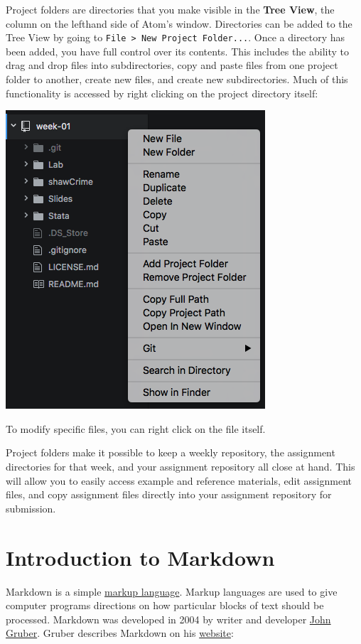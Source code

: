 \documentclass[]{book}
\theoremstyle{definition}
\theoremstyle{definition}
\theoremstyle{definition}
\theoremstyle{remark}
\begin{document}
Project folders are directories that you make visible in the
\textbf{Tree View}, the column on the lefthand side of Atom's window.
Directories can be added to the Tree View by going to
\texttt{File\ \textgreater{}\ New\ Project\ Folder...}. Once a directory
has been added, you have full control over its contents. This includes
the ability to drag and drop files into subdirectories, copy and paste
files from one project folder to another, create new files, and create
new subdirectories. Much of this functionality is accessed by right
clicking on the project directory itself:

\includegraphics[width=0.75\linewidth]{images/atomProject}

To modify specific files, you can right click on the file itself.

Project folders make it possible to keep a weekly repository, the
assignment directories for that week, and your assignment repository all
close at hand. This will allow you to easily access example and
reference materials, edit assignment files, and copy assignment files
directly into your assignment repository for submission.

\chapter{Introduction to Markdown}\label{introduction-to-markdown}

Markdown is a simple
\href{https://en.wikipedia.org/wiki/Markup_language}{markup language}.
Markup languages are used to give computer programs directions on how
particular blocks of text should be processed. Markdown was developed in
2004 by writer and developer \href{http://daringfireball.net}{John
Gruber}. Gruber describes Markdown on his
\href{http://daringfireball.net/projects/markdown/}{website}:
\end{document}
